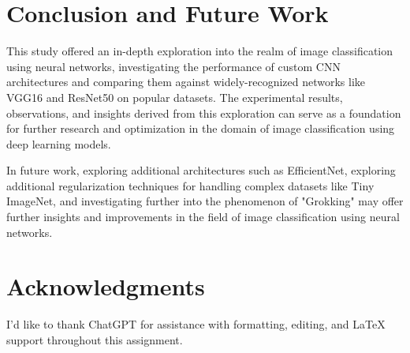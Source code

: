 \documentclass[letterpaper]{article}
\begin{document}
\section{Conclusion and Future Work}

This study offered an in-depth exploration into the realm of image classification using neural networks, investigating the performance of custom CNN architectures and comparing them against widely-recognized networks like VGG16 and ResNet50 on popular datasets. The experimental results, observations, and insights derived from this exploration can serve as a foundation for further research and optimization in the domain of image classification using deep learning models.

In future work, exploring additional architectures such as EfficientNet, exploring additional regularization techniques for handling complex datasets like Tiny ImageNet, and investigating further into the phenomenon of "Grokking" may offer further insights and improvements in the field of image classification using neural networks.

\section*{Acknowledgments}
I'd like to thank ChatGPT \cite{ChatGPT2023} for assistance with formatting, editing, and LaTeX support throughout this assignment.


\end{document}
